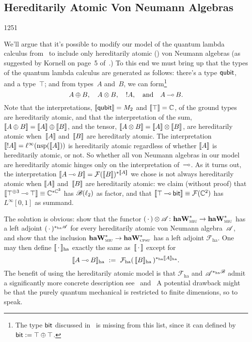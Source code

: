 \subsection{Hereditarily Atomic Von Neumann Algebras}
\begin{parsec}{1251}
\begin{point}{10}
We'll argue that it's possible to modify our model of the quantum lambda 
calculus from~\cite{model} to include only 
hereditarily atomic ()
von Neumann algebras
    (as suggested by Kornell on page~5 of~\cite{kornell2018quantum}.)
To this end
we must bring up that the types of the quantum lambda calculus
are generated as follows:
there's a type $\mathsf{qubit}$, and a type~$\top$;
and from types~$A$ and~$B$, we can form\footnote{The 
type $\mathsf{bit}$ discussed in~ is missing from this list,
since it can defined by $\mathsf{bit}:=\top\oplus\top$.}
\begin{equation*}
A\oplus B,\quad A\otimes B,\quad !A,\quad \text{and}\quad 
     A\mathbin{\multimap} B.
\end{equation*}
Note that 
the interpretations,
$\llbracket\mathsf{qubit}\rrbracket=M_2$
    and $\llbracket\top\rrbracket=\mathbb{C}$,
of the ground types
are hereditarily atomic,
and that the interpretation
of
the sum,
$\llbracket A\oplus B\rrbracket=\llbracket A\rrbracket\oplus\llbracket B\rrbracket$, and the tensor,
$\llbracket A\otimes B\rrbracket = \llbracket A\rrbracket\otimes \llbracket B\rrbracket$,
are hereditarily atomic
when~$\llbracket A\rrbracket$ and~$\llbracket B\rrbracket$ are hereditarly atomic.
The interpretation
$\llbracket!A\rrbracket = \ell^\infty(\mathrm{nsp}(\llbracket A\rrbracket))$
is hereditarily atomic regardless
of whether $\llbracket A\rrbracket$ is hereditarily atomic, or not.
So whether all von Neumann algebras
in our model are hereditarily atomic
hinges only on the interpretation
of~$\mathbin{\multimap}$.
As it turns out, 
the interpretation $\llbracket A\mathbin{\multimap} B\rrbracket = \mathcal{F}(\llbracket B\rrbracket)^{*\llbracket A\rrbracket}$
we chose is not always hereditarily atomic
when $\llbracket A\rrbracket$ and~$\llbracket B\rrbracket$
are hereditarily atomic:
    we claim (without proof) that
$\llbracket\top^{\oplus 3} \mathbin{\multimap} \top\rrbracket
\equiv \mathbb{C}^{*\mathbb{C}^3}$
has $\mathscr{B}(\ell_2)$  as factor,
and that $\llbracket\top\mathbin{\multimap} \mathsf{bit}\rrbracket\equiv\mathcal{F}(\mathbb{C}^2)$
has $L^\infty[0,1]$ as summand.
\end{point}
\begin{point}{20}
The solution is obvious:
show that the functor $(\,\cdot\,)\otimes \mathscr{A}\colon
\mathbf{haW}^*_{\text{\textsc{miu}}}\to\mathbf{haW}^*_{\text{\textsc{miu}}}$
has a left adjoint 
    $(\,\cdot\,)^{*_\mathrm{ha}\mathscr{A}}$
for every hereditarily atomic von Neumann 
algebra~$\mathscr{A}$,
and show that the inclusion $\mathbf{haW}^*_{\text{\textsc{miu}}}\to\mathbf{haW}^*_{\text{\textsc{cpsu}}}$
    has a left adjoint $\mathcal{F}_{\mathrm{ha}}$.
One may then define $\llbracket\,\cdot\,\rrbracket_\mathrm{ha}$
exactly the same as~$\llbracket\,\cdot\,\rrbracket$ except for
\begin{equation*}
    \llbracket A\mathbin{\multimap} B\rrbracket_{\mathrm{ha}}
    \ :=\ \mathcal{F}_\mathrm{ha}(\,
    \llbracket B\rrbracket_\mathrm{ha}\, )^{*_\mathrm{ha}\llbracket A\rrbracket_{\mathrm{ha}}}.
\end{equation*}
The benefit of using the hereditarily atomic model
is that
$\mathcal{F}_\mathrm{ha}$
and $\mathscr{A}^{*_\mathrm{ha}\mathscr{B}}$
admit a significantly more concrete
    description see~
    and~
A potential drawback might be that the purely quantum mechanical is restricted
to finite dimensions, so to speak.
\end{point}%
\end{parsec}%
